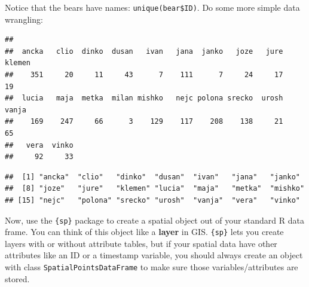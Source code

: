 \documentclass[]{book}
\newenvironment{Shaded}{\begin{snugshade}}{\end{snugshade}}
\newcommand{\CommentTok}[1]{\textcolor[rgb]{0.56,0.35,0.01}{\textit{#1}}}
\newcommand{\DecValTok}[1]{\textcolor[rgb]{0.00,0.00,0.81}{#1}}
\newcommand{\KeywordTok}[1]{\textcolor[rgb]{0.13,0.29,0.53}{\textbf{#1}}}
\newcommand{\NormalTok}[1]{#1}
\newcommand{\OperatorTok}[1]{\textcolor[rgb]{0.81,0.36,0.00}{\textbf{#1}}}
\newcommand{\StringTok}[1]{\textcolor[rgb]{0.31,0.60,0.02}{#1}}
\begin{document}
Notice that the bears have names: \texttt{unique(bear\$ID)}. Do some more simple data wrangling:

\begin{Shaded}
\end{Shaded}

\begin{verbatim}
## 
##  ancka   clio  dinko  dusan   ivan   jana  janko   joze   jure klemen 
##    351     20     11     43      7    111      7     24     17     19 
##  lucia   maja  metka  milan mishko   nejc polona srecko  urosh  vanja 
##    169    247     66      3    129    117    208    138     21     65 
##   vera  vinko 
##     92     33
\end{verbatim}

\begin{Shaded}
\end{Shaded}

\begin{verbatim}
##  [1] "ancka"  "clio"   "dinko"  "dusan"  "ivan"   "jana"   "janko" 
##  [8] "joze"   "jure"   "klemen" "lucia"  "maja"   "metka"  "mishko"
## [15] "nejc"   "polona" "srecko" "urosh"  "vanja"  "vera"   "vinko"
\end{verbatim}

Now, use the \texttt{\{sp\}} package \citep{R-sp} to create a spatial object out of your standard R data frame. You can think of this object like a \textbf{layer} in GIS. \texttt{\{sp\}} lets you create layers with or without attribute tables, but if your spatial data have other attributes like an ID or a timestamp variable, you should always create an object with class \texttt{SpatialPointsDataFrame} to make sure those variables/attributes are stored.
\end{document}
